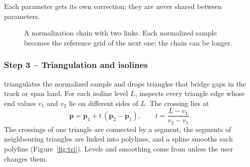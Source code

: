\documentclass{article}
\begin{document}
Each parameter gets its own correction; they are never shared between
parameters.

\begin{figure}[htbp]
\centering
{}
\caption{A normalization chain with two links. Each normalized sample becomes
the reference grid of the next one; the chain can be longer.}
\label{fig:chain}
\end{figure}

\subsubsection*{Step 3 -- Triangulation and isolines}

 triangulates the normalized sample and drops
triangles that bridge gaps in the track or span land. For each isoline level
$L$,  inspects every triangle edge whose end values $v_1$
and $v_2$ lie on different sides of $L$. The crossing lies at
\begin{equation*}
  \mathbf{p} = \mathbf{p}_1 + t\,(\mathbf{p}_2-\mathbf{p}_1),\qquad
  t = \frac{L-v_1}{v_2-v_1}.
\end{equation*}
The crossings of one triangle are connected by a segment, the segments of
neighbouring triangles are linked into polylines, and a spline smooths each
polyline (Figure~\ref{fig:tri}). Levels and smoothing come from
 unless the user changes them.
\end{document}

